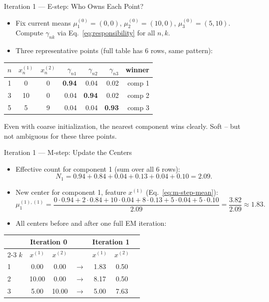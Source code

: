 \begin{frame}{Iteration 1 --- E-step: Who Owns Each Point?}
\small
\begin{itemize}
  \item Fix current means $\mu_1^{(0)}{=}(0,0)$, $\mu_2^{(0)}{=}(10,0)$, $\mu_3^{(0)}{=}(5,10)$.
  Compute $\gamma_{nk}$ via Eq.~\eqref{eq:responsibility} for all $n,k$.
  \pause
  \item Three representative points (full table has 6 rows, same pattern):
\end{itemize}

\vspace{0.4em}
\centering
\begin{tabular}{cccrrrr}
\hline
$n$ & $x_n^{(1)}$ & $x_n^{(2)}$ & $\gamma_{n1}$ & $\gamma_{n2}$ & $\gamma_{n3}$ & winner \\
\hline
1 & 0 & 0 & \textbf{0.94} & 0.04 & 0.02 & comp 1 \\
3 & 10 & 0 & 0.04 & \textbf{0.94} & 0.02 & comp 2 \\
5 & 5 & 9 & 0.04 & 0.04 & \textbf{0.93} & comp 3 \\
\hline
\end{tabular}

\raggedright
\pause
\begin{rlintuition}
  Even with coarse initialization, the nearest component wins clearly.  Soft -- but not ambiguous for these three points.
\end{rlintuition}
\end{frame}

\begin{frame}{Iteration 1 --- M-step: Update the Centers}
\small
\begin{itemize}
  \item Effective count for component 1 (sum over all 6 rows):
  \[
    N_1 = 0.94 + 0.84 + 0.04 + 0.13 + 0.04 + 0.10 = 2.09.
  \]
  \pause
  \item New center for component 1, feature $x^{(1)}$ (Eq.~\eqref{eq:m-step-mean}):
  \[
    \mu_1^{(1),(1)}
    = \frac{0{\cdot}0.94 + 2{\cdot}0.84 + 10{\cdot}0.04 + 8{\cdot}0.13 + 5{\cdot}0.04 + 5{\cdot}0.10}{2.09}
    = \frac{3.82}{2.09} \approx 1.83.
  \]
  \pause
  \item All centers before and after one full EM iteration:
\end{itemize}

\centering
\begin{tabular}{lcccccc}
\hline
 & \multicolumn{2}{c}{Iteration 0} & & \multicolumn{2}{c}{Iteration 1} \\
\cline{2-3}\cline{5-6}
$k$ & $x^{(1)}$ & $x^{(2)}$ & & $x^{(1)}$ & $x^{(2)}$ \\
\hline
1 & 0.00 & 0.00 & $\to$ & 1.83 & 0.50 \\
2 & 10.00 & 0.00 & $\to$ & 8.17 & 0.50 \\
3 & 5.00 & 10.00 & $\to$ & 5.00 & 7.63 \\
\hline
\end{tabular}
\end{frame}

